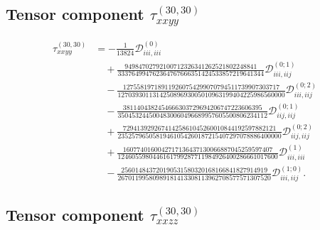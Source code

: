 \documentclass[aip,jcp,reprint]{revtex4-2}
\begin{document}
\begin{widetext}
\subsection{Tensor component $\tau^{(30,30)}_{xxyy}$}

\begin{equation}
\begin{aligned}
\tau^{(30,30)}_{xxyy} &=
-\frac{1}{13824}\mathcal{D}^{(0)}_{iii,iii}
\\
&\quad
+ \frac{94984702792100712326341262521802248841}
       {333764994762364767666351424533857219641344}
  \mathcal{D}^{(0;1)}_{iii,iij}
\\
&\quad
- \frac{127558197189119260754299070794511739907303717}
       {127039301131425089693005010963199404225986560000}
  \mathcal{D}^{(0;2)}_{iii,iij}
\\
&\quad
- \frac{3811404382454666303729694206747223606395}
       {3504532445004830060496689957605500806234112}
  \mathcal{D}^{(0;1)}_{iij,iij}
\\
&\quad
+ \frac{72941392926741425861045260010844192597882121}
       {23525796505819461054260187215407297078886400000}
  \mathcal{D}^{(0;2)}_{iij,iij}
\\
&\quad
+ \frac{1607740160042717136437130066887045259597407}
       {1246055980446161799287711984926400286661017600}
  \mathcal{D}^{(1)}_{iii,iii}
\\
&\quad
- \frac{256014843720190531580320168166841827914919}
       {26701199580989181413308113962708577571307520}
  \mathcal{D}^{(1;0)}_{iii,iij}.
\end{aligned}
\end{equation}

\subsection{Tensor component $\tau^{(30,30)}_{xxzz}$}


\end{widetext}
\end{document}

